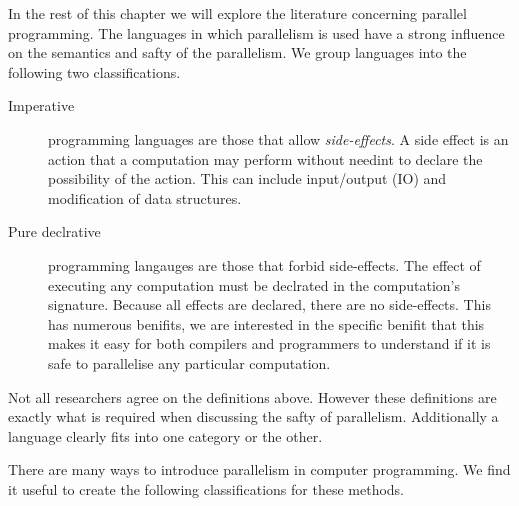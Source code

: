 
%


In the rest of this chapter we will explore the literature concerning
parallel programming.
The languages in which parallelism is used have a strong influence on the
semantics and safty of the parallelism.
We group languages into the following two classifications.

\begin{description}

    \item[Imperative] programming languages are those that allow
    \emph{side-effects}.
    A side effect is an action that a computation may perform without
    needint to declare the possibility of the action.
    This can include input/output (IO) and modification of data structures.

    \item[Pure declrative] programming langauges are those that forbid
    side-effects.
    The effect of executing any computation must be declrated in the
    computation's signature.
    Because all effects are declared, there are no side-effects.
    This has numerous benifits, we are interested in the specific benifit
    that this makes it easy for both compilers and programmers to understand
    if it is safe to parallelise any particular computation.

\end{description}

\noindent
Not all researchers agree on the definitions above.
However these definitions are exactly what is required when discussing
the safty of parallelism.
Additionally a language clearly fits into one category or the other.

There are many ways to introduce parallelism in computer programming.
We find it useful to create the following classifications for these methods.

